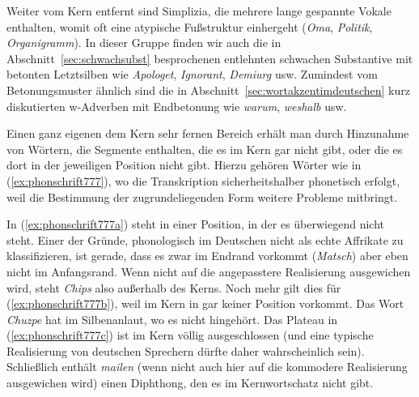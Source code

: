 Weiter vom Kern entfernt sind Simplizia, die mehrere lange gespannte Vokale enthalten, womit oft eine atypische Fußstruktur einhergeht (\textit{Oma}, \textit{Politik}, \textit{Organigramm}).
In dieser Gruppe finden wir auch die in Abschnitt~\ref{sec:schwachsubst} besprochenen entlehnten schwachen Substantive mit betonten Letztsilben wie \textit{Apologet}, \textit{Ignorant}, \textit{Demiurg} usw.
Zumindest vom Betonungsmuster ähnlich sind die in Abschnitt~\ref{sec:wortakzentimdeutschen} kurz diskutierten w-Adverben mit Endbetonung wie \textit{warum}, \textit{weshalb} usw.

Einen ganz eigenen dem Kern sehr fernen Bereich erhält man durch Hinzunahme von Wörtern, die Segmente enthalten, die es im Kern gar nicht gibt, oder die es dort in der jeweiligen Position nicht gibt.
Hierzu gehören Wörter wie in (\ref{ex:phonschrift777}), wo die Transkription sicherheitshalber phonetisch erfolgt, weil die Bestimmung der zugrundeliegenden Form weitere Probleme mitbringt.

\begin{exe}
  \ex\label{ex:phonschrift777}
  \begin{xlist}
  \end{xlist}
\end{exe}

In (\ref{ex:phonschrift777a}) steht \textipa{[\t{tS}]} in einer Position, in der es überwiegend nicht steht.
Einer der Gründe, phonologisch \textipa{[\t{tS}]} im Deutschen nicht als echte Affrikate zu klassifizieren, ist gerade, dass es zwar im Endrand vorkommt (\textit{Matsch}) aber eben nicht im Anfangsrand.
Wenn nicht auf die angepasstere Realisierung \textipa{[SIps]} ausgewichen wird, steht \textit{Chips} also außerhalb des Kerns.
Noch mehr gilt dies für (\ref{ex:phonschrift777b}), weil \textipa{[\t{dZ}]} im Kern in gar keiner Position vorkommt.
Das Wort \textit{Chuzpe} hat \textipa{[X]} im Silbenanlaut, wo es nicht hingehört.
Das Plateau \textipa{[pt]} in (\ref{ex:phonschrift777c}) ist im Kern völlig ausgeschlossen (und eine typische Realisierung von deutschen Sprechern dürfte daher wahrscheinlich \textipa{[p@tEKanodOn]} sein).
Schließlich enthält \textit{mailen} (wenn nicht auch hier auf die kommodere Realisierung \textipa{[me:l@n]} ausgewichen wird) einen Diphthong, den es im Kernwortschatz nicht gibt.

